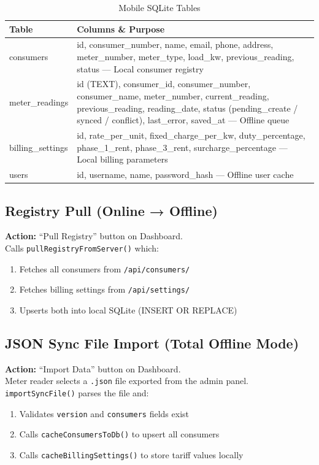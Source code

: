 \documentclass[12pt, a4paper]{report}
\begin{document}
\begin{table}[H]
\centering
\caption{Mobile SQLite Tables}
\begin{tabularx}{\textwidth}{>{\ttfamily}l X}
\toprule
\textbf{Table} & \textbf{Columns \& Purpose} \\
\midrule
consumers & id, consumer\_number, name, email, phone, address, meter\_number, meter\_type, load\_kw, previous\_reading, status — Local consumer registry \\
meter\_readings & id (TEXT), consumer\_id, consumer\_number, consumer\_name, meter\_number, current\_reading, previous\_reading, reading\_date, status (pending\_create / synced / conflict), last\_error, saved\_at — Offline queue \\
billing\_settings & id, rate\_per\_unit, fixed\_charge\_per\_kw, duty\_percentage, phase\_1\_rent, phase\_3\_rent, surcharge\_percentage — Local billing parameters \\
users & id, username, name, password\_hash — Offline user cache \\
\bottomrule
\end{tabularx}
\end{table}

\subsection{Registry Pull (Online → Offline)}
\textbf{Action:} ``Pull Registry'' button on Dashboard.\\
Calls \texttt{pullRegistryFromServer()} which:
\begin{enumerate}[leftmargin=1.8em]
    \item Fetches all consumers from \texttt{/api/consumers/}
    \item Fetches billing settings from \texttt{/api/settings/}
    \item Upserts both into local SQLite (INSERT OR REPLACE)
\end{enumerate}

\subsection{JSON Sync File Import (Total Offline Mode)}
\textbf{Action:} ``Import Data'' button on Dashboard.\\
Meter reader selects a \texttt{.json} file exported from the admin panel. \texttt{importSyncFile()} parses the file and:
\begin{enumerate}[leftmargin=1.8em]
    \item Validates \texttt{version} and \texttt{consumers} fields exist
    \item Calls \texttt{cacheConsumersToDb()} to upsert all consumers
    \item Calls \texttt{cacheBillingSettings()} to store tariff values locally
\end{enumerate}
\end{document}
